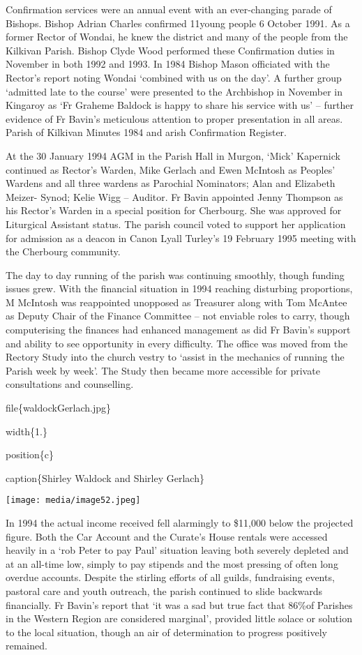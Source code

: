 Confirmation services were an annual event with an ever-changing parade of Bishops. Bishop Adrian Charles confirmed 11young people 6 October 1991. As a former Rector of Wondai, he knew the district and many of the people from the Kilkivan Parish. Bishop Clyde Wood performed these Confirmation duties in November in both 1992 and 1993. In 1984 Bishop Mason officiated with the Rector's report noting Wondai `combined with us on the day'. A further group `admitted late to the course' were presented to the Archbishop in November in Kingaroy as `Fr Graheme Baldock is happy to share his service with us' -- further evidence of Fr Bavin's meticulous attention to proper presentation in all areas. Parish of Kilkivan Minutes 1984 and arish Confirmation Register.

At the 30 January 1994 AGM in the Parish Hall in Murgon, `Mick' Kapernick continued as Rector's Warden, Mike Gerlach and Ewen McIntosh as Peoples' Wardens and all three wardens as Parochial Nominators; Alan and Elizabeth Meizer- Synod; Kelie Wigg -- Auditor. Fr Bavin appointed Jenny Thompson as his Rector's Warden in a special position for Cherbourg. She was approved for Liturgical Assistant status. The parish council voted to support her application for admission as a deacon in Canon Lyall Turley's 19 February 1995 meeting with the Cherbourg community.

The day to day running of the parish was continuing smoothly, though funding issues grew. With the financial situation in 1994 reaching disturbing proportions, M McIntosh was reappointed unopposed as Treasurer along with Tom McAntee as Deputy Chair of the Finance Committee -- not enviable roles to carry, though computerising the finances had enhanced management as did Fr Bavin's support and ability to see opportunity in every difficulty. The office was moved from the Rectory Study into the church vestry to `assist in the mechanics of running the Parish week by week'. The Study then became more accessible for private consultations and counselling.

file\{waldockGerlach.jpg\}

width\{1.\}

position\{c\}

caption\{Shirley Waldock and Shirley Gerlach\}

\texttt{[image: media/image52.jpeg]}

In 1994 the actual income received fell alarmingly to \$11,000 below the projected figure. Both the Car Account and the Curate's House rentals were accessed heavily in a `rob Peter to pay Paul' situation leaving both severely depleted and at an all-time low, simply to pay stipends and the most pressing of often long overdue accounts. Despite the stirling efforts of all guilds, fundraising events, pastoral care and youth outreach, the parish continued to slide backwards financially. Fr Bavin's report that `it was a sad but true fact that 86\%of Parishes in the Western Region are considered marginal', provided little solace or solution to the local situation, though an air of determination to progress positively remained.

